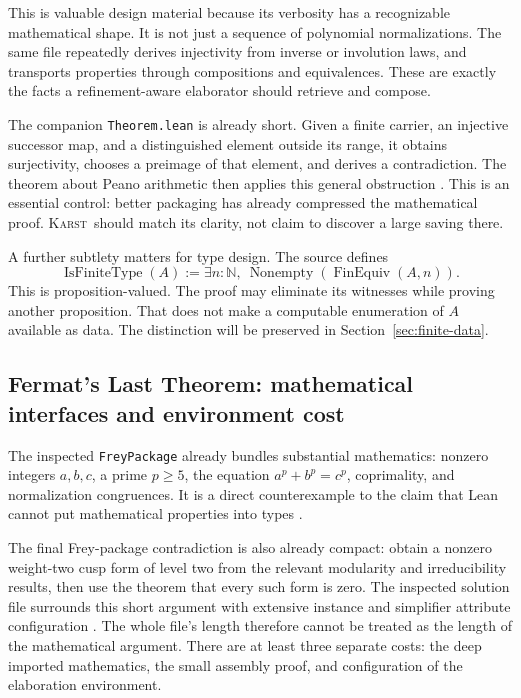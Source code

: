 \documentclass[11pt,letterpaper]{article}
\newcommand{\code}[1]{\nolinkurl{#1}}
\newcommand{\Karst}{\textsc{Karst}}
\newcommand{\N}{\mathbb N}
\theoremstyle{remark}
\begin{document}
This is valuable design material because its verbosity has a recognizable
mathematical shape. It is not just a sequence of polynomial normalizations.
The same file repeatedly derives injectivity from inverse or involution laws,
and transports properties through compositions and equivalences. These are
exactly the facts a refinement-aware elaborator should retrieve and compose.

The companion \code{Theorem.lean} is already short. Given a finite carrier,
an injective successor map, and a distinguished element outside its range,
it obtains surjectivity, chooses a preimage of that element, and derives a
contradiction. The theorem about Peano arithmetic then applies this general
obstruction \cite{nofinite}. This is an essential control: better packaging
has already compressed the mathematical proof. \Karst\ should match its
clarity, not claim to discover a large saving there.

A further subtlety matters for type design. The source defines
\[
 \operatorname{IsFiniteType}(A)
   :=\exists n:\N,\ \operatorname{Nonempty}(\operatorname{FinEquiv}(A,n)).
\]
This is proposition-valued. The proof may eliminate its witnesses while
proving another proposition. That does not make a computable enumeration of
$A$ available as data. The distinction will be preserved in
Section~\ref{sec:finite-data}.

\subsection{Fermat's Last Theorem: mathematical interfaces and environment cost}
The inspected \code{FreyPackage} already bundles substantial mathematics:
nonzero integers $a,b,c$, a prime $p\ge5$, the equation
$a^p+b^p=c^p$, coprimality, and normalization congruences. It is a direct
counterexample to the claim that Lean cannot put mathematical properties into
types \cite{freydef}.

The final Frey-package contradiction is also already compact: obtain a nonzero
weight-two cusp form of level two from the relevant modularity and
irreducibility results, then use the theorem that every such form is zero.
The inspected solution file surrounds this short argument with extensive
instance and simplifier attribute configuration \cite{freysol}.
The whole file's length therefore cannot be treated as the length of the
mathematical argument. There are at least three separate costs: the deep
imported mathematics, the small assembly proof, and configuration of the
elaboration environment.
\end{document}
